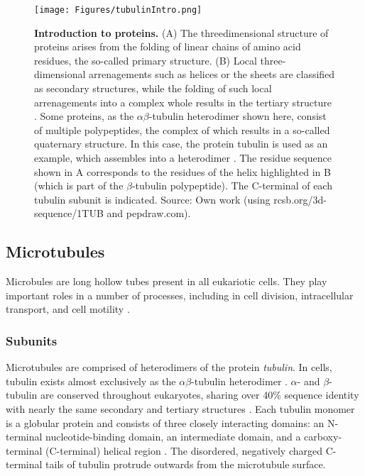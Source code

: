 \begin{figure}[h!tb]
	\centering
	\texttt{[image: Figures/tubulinIntro.png]}
	\caption[Introduction to proteins.]{\textbf{Introduction to proteins.}
	(A) The threedimensional structure of proteins arises from the folding of linear chains of amino acid residues, the so-called primary structure. (B) Local three-dimensional arrenagements such as helices or the sheets are classified as secondary structures, while the folding of such local arrenagements into a complex whole results in the tertiary structure . Some proteins, as the $\alpha\beta$-tubulin heterodimer shown here, consist of multiple polypeptides, the complex of which results in a so-called quaternary structure. In this case, the protein tubulin is used as an example, which assembles into a heterodimer . The residue sequence shown in A corresponds to the residues of the helix highlighted in B (which is part of the $\beta$-tubulin polypeptide). The C-terminal of each tubulin subunit is indicated. Source: Own work (using rcsb.org/3d-sequence/1TUB and pepdraw.com).
		}\label{proteins}
\end{figure}


\subsection{Microtubules}
\label{sec:microtubules}
Microbules are long hollow tubes present in all eukariotic cells. They play important roles in a number of processes, including in cell division, intracellular transport, and cell motility \parencite{Akhmanova2022}.

\subsubsection{Subunits}
\label{sec:tubulin}
Microtubules are comprised of heterodimers of the protein \textit{tubulin}. In cells, tubulin exists almost exclusively as the $\alpha\beta$-tubulin heterodimer . $\alpha$- and $\beta$-tubulin are conserved throughout eukaryotes, sharing over 40\% sequence identity with nearly the same secondary and tertiary structures \parencite{DOWNING199816}. Each tubulin monomer is a globular protein and consists of three closely interacting domains: an N-terminal nucleotide-binding domain, an intermediate domain, and a carboxy-terminal (C-terminal) helical region \parencite{ALUSHIN20141117}. The disordered, negatively charged C-terminal tails of tubulin protrude outwards from the microtubule surface.\par

